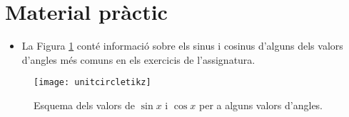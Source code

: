 \documentclass[12pt]{article}
\begin{document}
\section{Material pràctic}

\begin{itemize}
    \item La Figura \ref{Fig:unitcircle} conté informació sobre els sinus i cosinus d'alguns dels valors d'angles més comuns en els exercicis de l'assignatura.
\end{itemize}

\begin{figure}
    \begin{minipage}[r]{0.7\textwidth}
      \texttt{[image: unitcircletikz]}
    \end{minipage}\hfill
    \begin{minipage}[l]{0.3\textwidth}
      \caption{
        Esquema dels valors de $\sin x$ i $\cos x$ per a alguns valors d'angles.
      } \label{Fig:unitcircle}
    \end{minipage}
  \end{figure}



\end{document}
